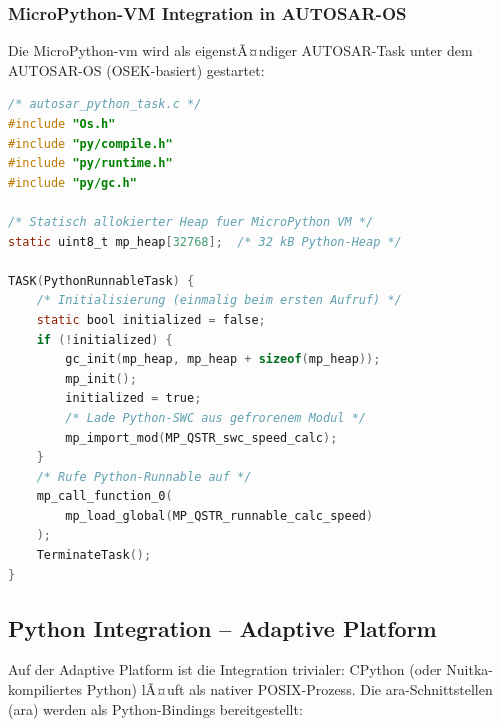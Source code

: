 ﻿\documentclass[12pt,a4paper,twoside]{article}
\begin{document}
\subsubsection{MicroPython-VM Integration in AUTOSAR-OS}

Die MicroPython-\gls{vm} wird als eigenstÃ¤ndiger AUTOSAR-Task unter
dem AUTOSAR-OS (OSEK-basiert) gestartet:

\begin{lstlisting}[language=C,caption={MicroPython VM als AUTOSAR-OS-Task},label=lst:mpy_task]
/* autosar_python_task.c */
#include "Os.h"
#include "py/compile.h"
#include "py/runtime.h"
#include "py/gc.h"

/* Statisch allokierter Heap fuer MicroPython VM */
static uint8_t mp_heap[32768];  /* 32 kB Python-Heap */

TASK(PythonRunnableTask) {
    /* Initialisierung (einmalig beim ersten Aufruf) */
    static bool initialized = false;
    if (!initialized) {
        gc_init(mp_heap, mp_heap + sizeof(mp_heap));
        mp_init();
        initialized = true;
        /* Lade Python-SWC aus gefrorenem Modul */
        mp_import_mod(MP_QSTR_swc_speed_calc);
    }
    /* Rufe Python-Runnable auf */
    mp_call_function_0(
        mp_load_global(MP_QSTR_runnable_calc_speed)
    );
    TerminateTask();
}
\end{lstlisting}

\subsection{Python Integration -- Adaptive Platform}
\label{subsec:ap_integration}

Auf der Adaptive Platform ist die Integration trivialer:
CPython (oder Nuitka-kompiliertes Python) lÃ¤uft als nativer POSIX-Prozess.
Die ara-Schnittstellen (\gls{ara}) werden als Python-Bindings bereitgestellt:
\end{document}
